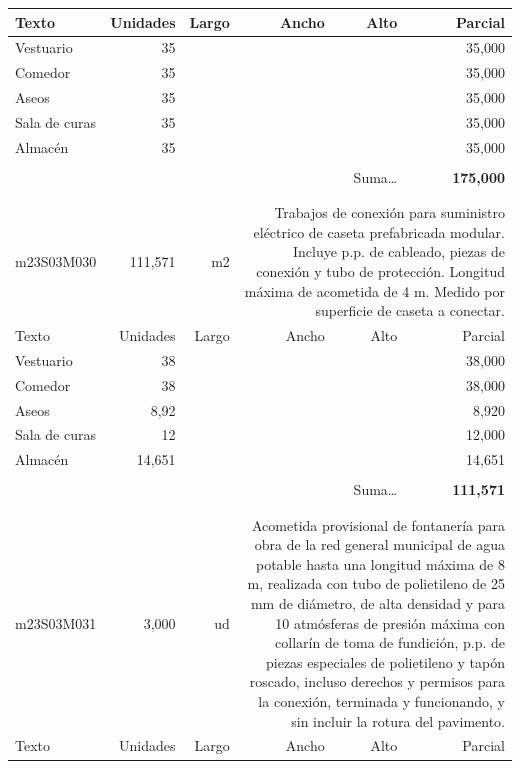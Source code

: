 \documentclass{book}%
\begin{document}
\begin{longtable}{lrrrrr}
Texto&Unidades&Largo&Ancho&Alto&Parcial\\%
\hline%
\multicolumn{1}{p{3.5cm}}{Vestuario}&35&&&&    35,000\\%
\multicolumn{1}{p{3.5cm}}{Comedor}&35&&&&    35,000\\%
\multicolumn{1}{p{3.5cm}}{Aseos}&35&&&&    35,000\\%
\multicolumn{1}{p{3.5cm}}{Sala de curas}&35&&&&    35,000\\%
\multicolumn{1}{p{3.5cm}}{Almacén}&35&&&&    35,000\\%
&&&&&\\%
\multicolumn{5}{r}{Suma\ldots}&\textbf{   175,000}\\%
\hline%
&&&&&\\%
&&&&&\\%
m23S03M030&   111,571& m2&\multicolumn{3}{p{6cm}}{\scriptsize Trabajos de conexión para suministro eléctrico de caseta prefabricada modular. Incluye p.p. de cableado, piezas de conexión y tubo de protección. Longitud máxima de acometida de 4 m. Medido por superficie de caseta a conectar.\normalsize}\\%
Texto&Unidades&Largo&Ancho&Alto&Parcial\\%
\hline%
\multicolumn{1}{p{3.5cm}}{Vestuario}&38&&&&    38,000\\%
\multicolumn{1}{p{3.5cm}}{Comedor}&38&&&&    38,000\\%
\multicolumn{1}{p{3.5cm}}{Aseos}&8,92&&&&     8,920\\%
\multicolumn{1}{p{3.5cm}}{Sala de curas}&12&&&&    12,000\\%
\multicolumn{1}{p{3.5cm}}{Almacén}&14,651&&&&    14,651\\%
&&&&&\\%
\multicolumn{5}{r}{Suma\ldots}&\textbf{   111,571}\\%
\hline%
&&&&&\\%
&&&&&\\%
m23S03M031&     3,000& ud&\multicolumn{3}{p{6cm}}{\scriptsize Acometida provisional de fontanería para obra de la red general municipal de agua potable hasta una longitud máxima de 8 m, realizada con tubo de polietileno de 25 mm de diámetro, de alta densidad y para 10 atmósferas de presión máxima con collarín de toma de fundición, p.p. de piezas especiales de polietileno y tapón roscado, incluso derechos y permisos para la conexión, terminada y funcionando, y sin incluir la rotura del pavimento.\normalsize}\\%
Texto&Unidades&Largo&Ancho&Alto&Parcial\\%

\end{longtable}
\end{document}
